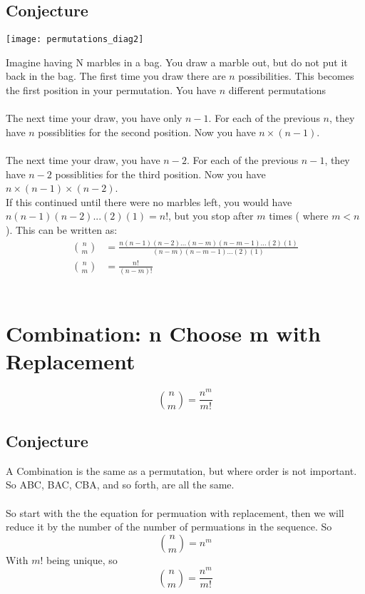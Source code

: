 \documentclass[11pt]{book}
\begin{document}
\subsection{Conjecture}
\begin{center}
\texttt{[image: permutations\_diag2]}
\end{center}
Imagine having N marbles in a bag.  You draw a marble out, but do not put it back in the bag.  The first time you draw there are \(n\) possibilities.  This becomes the first position in your permutation. You have \(n\) different permutations\\
\\
The next time your draw, you have only \(n-1\).  For each of the previous \(n\), they have \(n\) possiblities for the second position.  Now you have \(n\times (n-1)\). \\
\\
The next time your draw, you have \(n-2\).  For each of the previous \(n-1\), they have \(n-2\) possiblities for the third position.  Now you have \(n\times (n-1) \times (n-2) \). \\
If this continued until there were no marbles left, you would have \(n(n-1)(n-2)...(2)(1) = n!\), but you stop after \(m\) times ( where \(m<n\)).  This can be written as:\\
\begin{align*}
{n \choose m} &= \frac{n(n-1)(n-2)...(n-m)(n-m-1)...(2)(1)}{(n-m)(n-m-1)...(2)(1)}\\
{n \choose m} &= \frac{n!}{(n-m)!}
\end{align*}
\\
\section{ Combination: n Choose m with Replacement}
\[{n \choose m} = \frac{n^m}{m!}\]

\subsection{Conjecture}
A Combination is the same as a permutation, but where order is not important.  So ABC, BAC, CBA, and so forth, are all the same.\\
\\
So start with the the equation for permuation with replacement, then we will reduce it by the number of the number of permuations in the sequence. So\\
\[{n \choose m} = n^m\]
With \(m!\) being unique, so\\
\[{n \choose m} = \frac{n^m}{m!}\]
\end{document}
